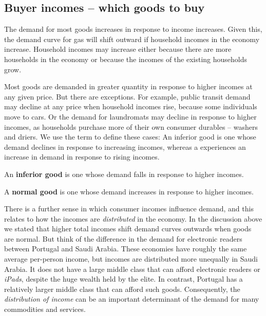 \newhtmlpage

\subsection*{Buyer incomes -- which goods to buy}

The demand for most goods increases in response to income increases. Given
this, the demand curve for gas will shift outward if household incomes in
the economy increase. Household incomes may increase either because there
are more households in the economy or because the incomes of the existing
households grow.

Most goods are demanded in greater quantity in response to higher incomes at
any given price. But there are exceptions. For example, public transit
demand may decline at any price when household incomes rise, because some
individuals move to cars. Or the demand for laundromats may decline in
response to higher incomes, as households purchase more of their own
consumer durables -- washers and driers. We use the term %
 to define these cases: An inferior good is one
whose demand declines in response to increasing incomes, whereas a %
 experiences an increase in demand in response to
rising incomes.

\begin{DefBox}
An \textbf{inferior good} is one whose demand falls in response to higher incomes.

A \textbf{normal good} is one whose demand increases in response to higher incomes.
\end{DefBox}

There is a further sense in which consumer incomes influence demand, and
this relates to how the incomes are \textit{distributed} in the economy. In
the discussion above we stated that higher total incomes shift demand curves
outwards when goods are normal. But think of the difference in the demand
for electronic readers between Portugal and Saudi Arabia. These economies
have roughly the same average per-person income, but incomes are distributed
more unequally in Saudi Arabia. It does not have a large middle class that
can afford electronic readers or \textit{iPads}, despite the huge wealth
held by the elite. In contrast, Portugal has a relatively larger middle
class that can afford such goods. Consequently, the \textit{distribution of
income} can be an important determinant of the demand for many commodities
and services.

\newhtmlpage

